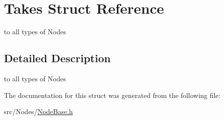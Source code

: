 \hypertarget{struct_takes}{}\section{Takes Struct Reference}
\label{struct_takes}


to all types of Nodes  




\subsection{Detailed Description}
to all types of Nodes 

The documentation for this struct was generated from the following file\+:\begin{DoxyCompactItemize}
\item 
src/\+Nodes/\hyperlink{_node_base_8h}{Node\+Base.\+h}\end{DoxyCompactItemize}
